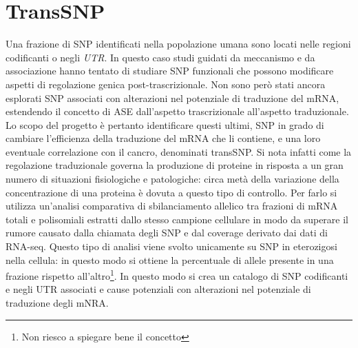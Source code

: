 \section{TransSNP}
Una frazione di SNP identificati nella popolazione umana sono locati nelle regioni codificanti o negli \emph{UTR}.
In questo caso studi guidati da meccanismo e da associazione hanno tentato di studiare SNP funzionali che possono modificare aspetti di regolazione genica post-trascrizionale.
Non sono per\`o stati ancora esplorati SNP associati con alterazioni nel potenziale di traduzione del mRNA, estendendo il concetto di ASE dall'aspetto trascrizionale all'aspetto traduzionale.
Lo scopo del progetto \`e pertanto identificare questi ultimi, SNP in grado di cambiare l'efficienza della traduzione del mRNA che li contiene, e una loro eventuale correlazione con il cancro, denominati transSNP.
Si nota infatti come la regolazione traduzionale governa la produzione di proteine in risposta a un gran numero di situazioni fisiologiche e patologiche: circa met\`a della variazione della concentrazione di una proteina \`e dovuta a questo tipo di controllo.
Per farlo si utilizza un'analisi comparativa di sbilanciamento allelico tra frazioni di mRNA totali e polisomiali estratti dallo stesso campione cellulare in modo da superare il rumore causato dalla chiamata degli SNP e dal coverage derivato dai dati di RNA-seq.
Questo tipo di analisi viene svolto unicamente su SNP in eterozigosi nella cellula: in questo modo si ottiene la percentuale di allele presente in una frazione rispetto all'altro\footnote{Non riesco a spiegare bene il concetto}.
In questo modo si crea un catalogo di SNP codificanti e negli UTR associati e cause potenziali con alterazioni nel potenziale di traduzione degli mNRA.


